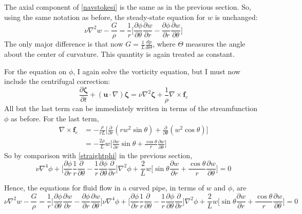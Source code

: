\documentclass[10pt,a4paper]{report}
\begin{document}
The axial component of \eqref{navstokesi} is the same as in the previous section. So, using the same notation as before, the steady-state equation for $w$ is unchanged:
\begin{equation*}
\nu \nabla^2 w - \frac{G}{\rho} = \frac{1}{r} \bigg[\frac{\partial \phi}{\partial \theta} \frac{\partial w}{\partial r} - \frac{\partial \phi}{\partial r} \frac{\partial w}{\partial \theta}\bigg]
\end{equation*}
The only major difference is that now $G = \frac{1}{L} \frac{d p}{d \Theta}$, where $\Theta$ measures the angle about the center of curvature. This quantity is again treated as constant.

For the equation on $\phi$, I again solve the vorticity equation, but I must now include the centrifugal correction:
\begin{equation*}
\frac{\partial \bm{\zeta}}{\partial t} + (\bm{u} \cdot \nabla)\bm{\zeta} = \nu \nabla^2 \bm{\zeta} + \frac{1}{\rho} \nabla \times \bm{f}_c
\end{equation*}
All but the last term can be immediately written in terms of the streamfunction $\phi$ as before. For the last term,
\begin{equation*}
\begin{split}
\nabla \times \bm{f}_c & = -\frac{\rho}{r L} \bigg[\frac{\partial}{\partial r}(r w^2 \sin \theta) + \frac{\partial}{\partial \theta}(w^2 \cos \theta)\bigg] \\
& = -\frac{2 \rho}{L} w \bigg[\frac{\partial w}{\partial r} \sin \theta + \frac{\cos \theta}{r} \frac{\partial w}{\partial \theta}\bigg]
\end{split}
\end{equation*}
So by comparison with \eqref{straightphi} in the previous section,
\begin{equation*}
\nu \nabla^4 \phi + \bigg[\frac{\partial \phi}{\partial r} \frac{1}{r} \frac{\partial}{\partial \theta} - \frac{1}{r} \frac{\partial \phi}{\partial \theta} \frac{\partial}{\partial r} \bigg] \nabla^2 \phi + \frac{2}{L} w \bigg[\sin \theta \frac{\partial w}{\partial r} + \frac{\cos \theta}{r} \frac{\partial w}{\partial \theta} \bigg] = 0
\end{equation*}

Hence, the equations for fluid flow in a curved pipe, in terms of $w$ and $\phi$, are
\begin{subequations}
\begin{equation}
\nu \nabla^2 w - \frac{G}{\rho} = \frac{1}{r} \bigg[\frac{\partial \phi}{\partial \theta} \frac{\partial w}{\partial r} - \frac{\partial \phi}{\partial r} \frac{\partial w}{\partial \theta}\bigg]
\end{equation}
\begin{equation}
\nu \nabla^4 \phi + \bigg[\frac{\partial \phi}{\partial r} \frac{1}{r} \frac{\partial}{\partial \theta} - \frac{1}{r} \frac{\partial \phi}{\partial \theta} \frac{\partial}{\partial r} \bigg] \nabla^2 \phi + \frac{2}{L} w \bigg[\sin \theta \frac{\partial w}{\partial r} + \frac{\cos \theta}{r} \frac{\partial w}{\partial \theta} \bigg] = 0
\end{equation}
\end{subequations}
\end{document}
